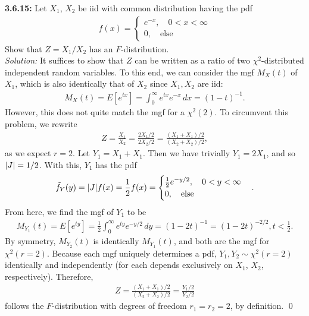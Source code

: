 \documentclass{book}
\theoremstyle{definition}
\newcommand{\Else}{\text{else}}
\newcommand{\f}[2]{\frac{#1}{#2}}
\begin{document}
\newpage

\noindent\textbf{3.6.15:} Let $X_1$, $X_2$ be iid with common distribution having the pdf 
\begin{align}
f(x) = \begin{cases}
e^{-x}, \quad 0< x < \infty\\
0, \quad \text{else}
\end{cases}
\end{align}
Show that $Z = X_1/X_2$ has an $F$-distribution.\\

\noindent \textit{Solution:}  It suffices to show that $Z$ can be written as a ratio of two $\chi^2$-distributed independent random variables. To this end, we can consider the mgf $M_X(t)$ of $X_1$, which is also identically that of $X_2$ since $X_1, X_2$ are iid:
\begin{align}
M_X(t) = E[e^{tx}] = \int^\infty_0 e^{tx}e^{-x} \,dx = (1-t)^{-1}.
\end{align}
However, this does not quite match the mgf for a $\chi^2(2)$. To circumvent this problem, we rewrite
\begin{align}
Z = \f{X_1}{X_2} =\f{2X_1/2}{2X_2/2}  = \f{(X_1+X_1)/2}{(X_2+X_2)/2},
\end{align}
as we expect $r=2$. Let $Y_1 = X_1 + X_1$. Then we have trivially $Y_1 =2X_1$, and so $\abs{J} = 1/2$. With this, $Y_1$ has the pdf 
\begin{align}
\tilde{f}_Y(y) = \abs{J}f(x) = \f{1}{2}f(x) = \begin{cases}
\f{1}{2}e^{-y/2}, \quad 0 < y < \infty\\
0, \quad \Else
\end{cases}. 
\end{align}
From here, we find the mgf of $Y_1$ to be 
\begin{align}
M_{Y_1}(t) = E[e^{ty}] = \f{1}{2}\int^\infty_{0}e^{ty}e^{-y/2}\,dy = (1-2t)^{-1} = (1-2t)^{-2/2}, t < \f{1}{2}.
\end{align}
By symmetry, $M_{Y_2}(t)$ is identically $M_{Y_1}(t)$, and both are the mgf for $\chi^2(r=2)$. Because each mgf uniquely determines a pdf, $Y_1, Y_2 \sim \chi^2(r=2)$ identically and independently (for each depends exclusively on $X_1$, $X_2$, respectively). Therefore, 
\begin{align}
Z = \f{(X_1+X_1)/2}{(X_2+X_2)/2} = \f{Y_1/2}{Y_2/2}
\end{align}
follows the $F$-distribution with degrees of freedom $r_1 = r_2 = 2$, by definition. \qed
\end{document}
